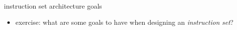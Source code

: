 \begin{frame}{instruction set architecture goals}
    \begin{itemize}
    \item exercise: what are some goals to have when designing an \textit{instruction set}?
    \end{itemize}
\end{frame}

